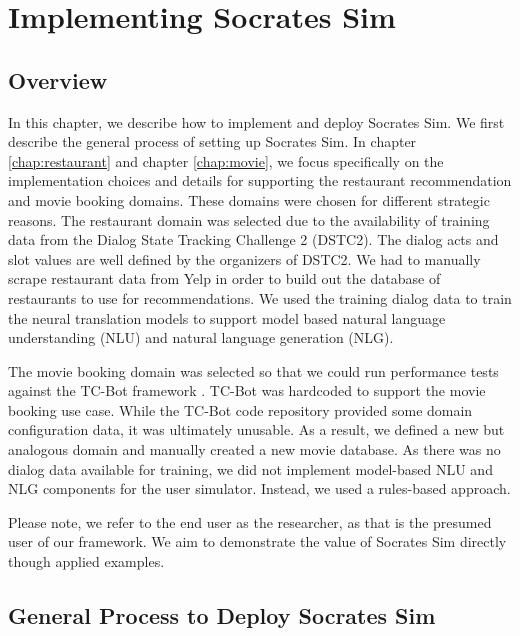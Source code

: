 \chapter{Implementing Socrates Sim}
\label{chap:implementation}

\section{Overview}

In this chapter, we describe how to implement and deploy Socrates Sim. We first describe the general process of setting up Socrates Sim. In chapter \ref{chap:restaurant} and chapter \ref{chap:movie}, we focus specifically on the implementation choices and details for supporting the restaurant recommendation and movie booking domains. These domains were chosen for different strategic reasons. The restaurant domain was selected due to the availability of training data from the Dialog State Tracking Challenge 2 (DSTC2). The dialog acts and slot values are well defined by the organizers of DSTC2. We had to manually scrape restaurant data from Yelp in order to build out the database of restaurants to use for recommendations. We used the training dialog data to train the neural translation models to support model based natural language understanding (NLU) and natural language generation (NLG). 

 The movie booking domain was selected so that we could run performance tests against the TC-Bot framework \cite{li_end_to_end}. TC-Bot was hardcoded to support the movie booking use case. While the TC-Bot code repository provided some domain configuration data, it was ultimately unusable. As a result, we defined a new but analogous domain and manually created a new movie database. As there was no dialog data available for training, we did not implement model-based NLU and NLG components for the user simulator. Instead, we used a rules-based approach. 
 
Please note, we refer to the end user as the researcher, as that is the presumed user of our framework. We aim to demonstrate the value of Socrates Sim directly though applied examples. 

\section{General Process to Deploy Socrates Sim}

